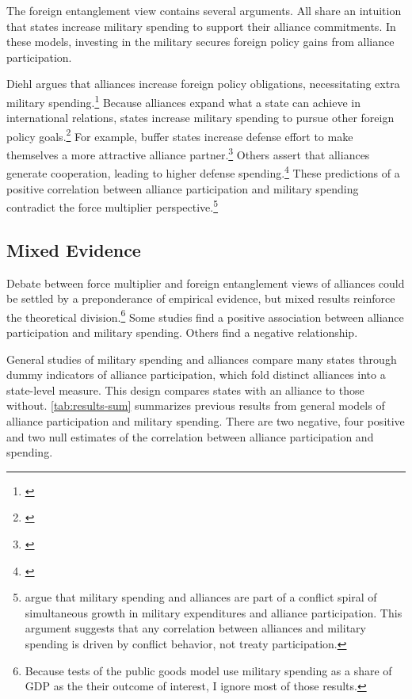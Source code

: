 \documentclass[12pt]{article}
\begin{document}
The foreign entanglement view contains several arguments.
All share an intuition that states increase military spending to support their alliance commitments. 
In these models, investing in the military secures foreign policy gains from alliance participation. 


Diehl argues that alliances increase foreign policy obligations, necessitating extra military spending.\footnote{\citep{Diehl1994}}
Because alliances expand what a state can achieve in international relations, states increase military spending to pursue other foreign policy goals.\footnote{\citep{MorganPalmer2006}}
For example, buffer states increase defense effort to make themselves a more attractive alliance partner.\footnote{\citep{Horowitzetal2017}}
Others assert that alliances generate cooperation, leading to higher defense spending.\footnote{\citep{Palmer1990, QuirozFlores2011}} 
These predictions of a positive correlation between alliance participation and military spending contradict the force multiplier perspective.\footnote{
\citet{SeneseVasquez2008} argue that military spending and alliances are part of a conflict spiral of simultaneous growth in military expenditures and alliance participation. 
This argument suggests that any correlation between alliances and military spending is driven by conflict behavior, not treaty participation.
}


\subsection{Mixed Evidence} 


Debate between force multiplier and foreign entanglement views of alliances could be settled by a preponderance of empirical evidence, but mixed results reinforce the theoretical division.\footnote{
Because tests of the public goods model use military spending as a share of GDP as the their outcome of interest, I ignore most of those results.}
Some studies find a positive association between alliance participation and military spending. 
Others find a negative relationship. 


General studies of military spending and alliances compare many states through dummy indicators of alliance participation, which fold distinct alliances into a state-level measure. 
This design compares states with an alliance to those without.
\autoref{tab:results-sum} summarizes previous results from general models of alliance participation and military spending. 
There are two negative, four positive and two null estimates of the correlation between alliance participation and spending. 
\end{document}
